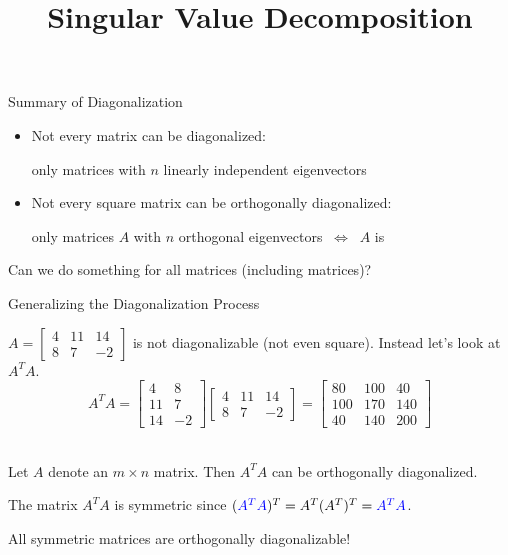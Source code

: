 \documentclass[xcolor=dvipsnames,aspectratio=169,t]{beamer}
\title{Singular Value Decomposition}
\begin{document}
\maketitle

\begin{frame}{Summary of Diagonalization}
  \bigskip

  \begin{itemize}
    \item Not every matrix can be \alert{diagonalized}:
    \smallskip
    
    \qquad only  matrices with $n$ linearly independent eigenvectors
    \bigskip
    
    \item Not every square matrix can be \alert{orthogonally diagonalized}:
    \smallskip
    
    \qquad only  matrices $A$ with $n$ orthogonal eigenvectors 
      $\ \Leftrightarrow\ $ $A$ is 
      \bigskip
  \end{itemize}
  \vspace*{1em}
  
  \pause
  \begin{center}
  Can we do something  for \alert{all} matrices (including  matrices)?
  \end{center}
\end{frame}


\begin{frame}{Generalizing the Diagonalization Process}
  \medskip

  $A = \begin{bmatrix} 4 & 11 & 14 \\ 8 & 7 & -2 \end{bmatrix}$ is \alert{not} diagonalizable (not even square).
  Instead let's look at $A^T A$.
  \[ A^T A = \begin{bmatrix} 4 & 8 \\ 11 & 7 \\ 14 & -2 \end{bmatrix} \begin{bmatrix} 4 & 11 & 14 \\ 8 & 7 & -2 \end{bmatrix} = \begin{bmatrix} 80 & 100 & 40 \\ 100 & 170 & 140 \\ 40 & 140 & 200 \end{bmatrix}\]
  ~

  \pause
  \begin{theorem}
  Let $A$ denote an $m \times n$ matrix. Then $A^T A$ can be \alert{orthogonally diagonalized}.
  \end{theorem}

  \pause
  \smallskip
  
  The matrix $A^T A$ is \alert{symmetric} since $(\textcolor{blue}{A^T A})^T = A^T (A^T)^T = \textcolor{blue}{A^T A}$.
  \smallskip
  
  All symmetric matrices are orthogonally diagonalizable!
  \hfill\blue{\qed}
\end{frame}
\end{document}
